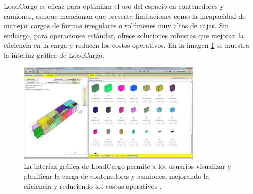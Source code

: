 LoadCargo es eficaz para optimizar el uso del espacio en contenedores y camiones, aunque mencionan que presenta limitaciones como la incapacidad de manejar cargas de formas irregulares o volúmenes muy altos de cajas. Sin embargo, para operaciones estándar, ofrece soluciones robustas que mejoran la eficiencia en la carga y reducen los costos operativos. En la imagen \ref{fig:loadcargo} se muestra la interfaz gráfica de LoadCargo.

\begin{figure}[H]
    \centering
    \includegraphics[width=0.8\textwidth]{Figures/loadcargo.jpg}
    \caption{La interfaz gráfica de LoadCargo permite a los usuarios visualizar y planificar la carga de contenedores y camiones, mejorando la eficiencia y reduciendo los costos operativos \parencite{loadcargo2024}.}
    \label{fig:loadcargo}
\end{figure}